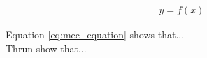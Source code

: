 \begin{align}
\label{eq:mec_equation}
y = f(x)
\end{align}

Equation \ref{eq:mec_equation} shows that...\\
Thrun \etal \cite{Thrun} show that... 



